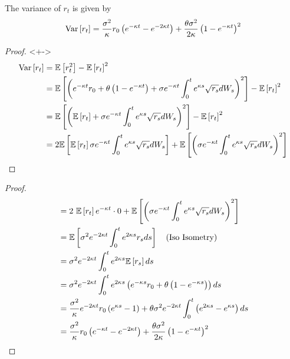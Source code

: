 \begin{frame}
	\begin{proposition}
		The variance of \( r_t \) is given by
		\[
			\text{Var} \left[ r_t \right] = \frac{\sigma^2}{\kappa} r_0
			\left( e^{-\kappa t} - e^{-2\kappa t} \right) +
			\frac{\theta\sigma^2}{2\kappa} \left( 1 - e^{-\kappa t} \right)^2
		\]
	\end{proposition}
	\begin{proof}<+->
		\begin{align*}
			\text{Var} \left[ r_t \right] &= \mathbb{E} \left[ r_t^2 \right] - \mathbb{E} \left[ r_t \right]^2 \\
			&= \mathbb{E} \left[ \left( e^{-\kappa t} r_0 + \theta
				\left( 1 - e^{-\kappa t} \right) + \sigma e^{-\kappa t}
				\int_0^t e^{\kappa s} \sqrt{r_s} dW_s \right)^2 \right] - \mathbb{E} \left[ r_t \right]^2 \\
			&= \mathbb{E} \left[ \left( \mathbb{E} \left[ r_t \right] + \sigma e^{-\kappa t}
				\int_0^t e^{\kappa s} \sqrt{r_s} dW_s \right)^2 \right]
				- \mathbb{E} \left[ r_t \right]^2 \\
			&= 2\mathbb{E} \left[ \mathbb{E} \left[ r_t \right] \sigma e^{-\kappa t}
				\int_0^t e^{\kappa s} \sqrt{r_s} dW_s \right]
				+ \mathbb{E} \left[ \left( \sigma e^{-\kappa t} \int_0^t e^{\kappa s}
				\sqrt{r_s} dW_s \right)^2 \right]
		\end{align*}
	\end{proof}
\end{frame}

\begin{frame}
	\begin{proof}
		\begin{align*}
			&= 2\ \mathbb{E} \left[ r_t \right] e^{-\kappa t} \cdot 0 +
				\mathbb{E} \left[ \left( \sigma e^{-\kappa t} \int_0^t e^{\kappa s}
				\sqrt{r_s} dW_s \right)^2 \right] \\
			&= \mathbb{E} \left[ \sigma^2 e^{-2\kappa t} \int_0^t e^{2\kappa s} r_s ds \right]
				\quad (\text{Iso Isometry}) \\
			&= \sigma^2 e^{-2\kappa t}
				\int_0^t e^{2\kappa s} \mathbb{E} \left[ r_s \right] ds \\
			&= \sigma^2 e^{-2\kappa t}
				\int_0^t e^{2\kappa s} \left( e^{-\kappa s} r_0 +
				\theta \left( 1 - e^{-\kappa s} \right) \right) ds \\
			&= \frac{\sigma^2}{\kappa} e^{-2\kappa t} r_0
				\left( e^{\kappa s} - 1 \right)
				+ \theta\sigma^2 e^{-2\kappa t}
				\int_0^t \left( e^{2\kappa s} - e^{\kappa s} \right) ds \\
			&= \frac{\sigma^2}{\kappa} r_0
				\left( e^{-\kappa t} - e^{-2\kappa t} \right) +
				\frac{\theta\sigma^2}{2\kappa} \left( 1 - e^{-\kappa t} \right)^2
		\end{align*}
	\end{proof}
\end{frame}

